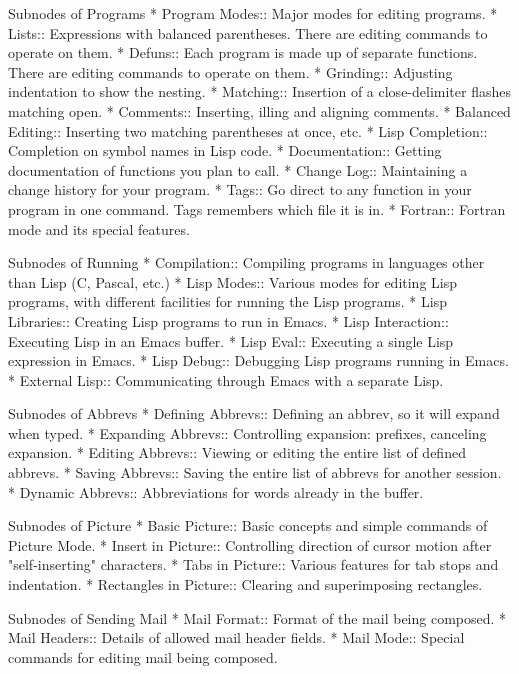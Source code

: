 Subnodes of Programs
* Program Modes::       Major modes for editing programs.
* Lists::       Expressions with balanced parentheses.
                 There are editing commands to operate on them.
* Defuns::      Each program is made up of separate functions.
                 There are editing commands to operate on them.
* Grinding::    Adjusting indentation to show the nesting.
* Matching::    Insertion of a close-delimiter flashes matching open.
* Comments::    Inserting, illing and aligning comments.
* Balanced Editing::    Inserting two matching parentheses at once, etc.
* Lisp Completion::     Completion on symbol names in Lisp code.
* Documentation::       Getting documentation of functions you plan to call.
* Change Log::  Maintaining a change history for your program.
* Tags::        Go direct to any function in your program in one
                 command.  Tags remembers which file it is in.
* Fortran::	Fortran mode and its special features.

Subnodes of Running
* Compilation::       Compiling programs in languages other than Lisp
                       (C, Pascal, etc.)
* Lisp Modes::        Various modes for editing Lisp programs, with
                       different facilities for running the Lisp programs.
* Lisp Libraries::    Creating Lisp programs to run in Emacs.
* Lisp Interaction::  Executing Lisp in an Emacs buffer.
* Lisp Eval::         Executing a single Lisp expression in Emacs.
* Lisp Debug::        Debugging Lisp programs running in Emacs.
* External Lisp::     Communicating through Emacs with a separate Lisp.

Subnodes of Abbrevs
* Defining Abbrevs::  Defining an abbrev, so it will expand when typed.
* Expanding Abbrevs:: Controlling expansion: prefixes, canceling expansion.
* Editing Abbrevs::   Viewing or editing the entire list of defined abbrevs.
* Saving Abbrevs::    Saving the entire list of abbrevs for another session.
* Dynamic Abbrevs::   Abbreviations for words already in the buffer.

Subnodes of Picture
* Basic Picture::     Basic concepts and simple commands of Picture Mode.
* Insert in Picture:: Controlling direction of cursor motion
                       after "self-inserting" characters.
* Tabs in Picture::   Various features for tab stops and indentation.
* Rectangles in Picture:: Clearing and superimposing rectangles.

Subnodes of Sending Mail
* Mail Format::       Format of the mail being composed.
* Mail Headers::      Details of allowed mail header fields.
* Mail Mode::         Special commands for editing mail being composed.

